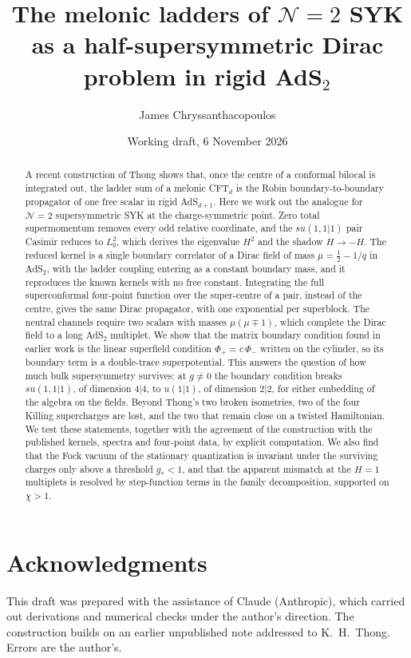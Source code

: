 \documentclass[11pt,a4paper]{article}
\title{\vspace{-1.5cm}\textbf{\Large The melonic ladders of $\mathcal{N}=2$ SYK\\ as a half-supersymmetric Dirac problem in rigid AdS$_2$}}
\author{James Chryssanthacopoulos}
\date{\small Working draft, 6 November 2026}
\numberwithin{equation}{section}
\theoremstyle{plain}
\theoremstyle{remark}
\newcommand{\cN}{\mathcal{N}}
\newcommand{\half}{\tfrac12}
\begin{document}
\maketitle

\begin{abstract}
\noindent
A recent construction of Thong shows that, once the centre of a conformal bilocal is integrated out, the ladder sum of a melonic CFT$_d$ is the Robin boundary-to-boundary propagator of one free scalar in rigid AdS$_{d+1}$. Here we work out the analogue for $\cN=2$ supersymmetric SYK at the charge-symmetric point. Zero total supermomentum removes every odd relative coordinate, and the $su(1,1|1)$ pair Casimir reduces to $L_0^2$, which derives the eigenvalue $H^2$ and the shadow $H\to-H$. The reduced kernel is a single boundary correlator of a Dirac field of mass $\mu=\half-1/q$ in AdS$_2$, with the ladder coupling entering as a constant boundary mass, and it reproduces the known kernels with no free constant. Integrating the full superconformal four-point function over the super-centre of a pair, instead of the centre, gives the same Dirac propagator, with one exponential per superblock. The neutral channels require two scalars with masses $\mu(\mu\mp1)$, which complete the Dirac field to a long AdS$_2$ multiplet. We show that the matrix boundary condition found in earlier work is the linear superfield condition $\Phi_+=c\,\Phi_-$ written on the cylinder, so its boundary term is a double-trace superpotential. This answers the question of how much bulk supersymmetry survives: at $g\neq0$ the boundary condition breaks $su(1,1|1)$, of dimension $4|4$, to $u(1|1)$, of dimension $2|2$, for either embedding of the algebra on the fields. Beyond Thong's two broken isometries, two of the four Killing supercharges are lost, and the two that remain close on a twisted Hamiltonian. We test these statements, together with the agreement of the construction with the published kernels, spectra and four-point data, by explicit computation. We also find that the Fock vacuum of the stationary quantization is invariant under the surviving charges only above a threshold $g_*<1$, and that the apparent mismatch at the $H=1$ multiplets is resolved by step-function terms in the family decomposition, supported on $\chi>1$.
\end{abstract}

\tableofcontents










\appendix



\section*{Acknowledgments}
This draft was prepared with the assistance of Claude (Anthropic), which carried out derivations and numerical checks under the author's direction. The construction builds on an earlier unpublished note addressed to K.~H.~Thong. Errors are the author's.


\end{document}
